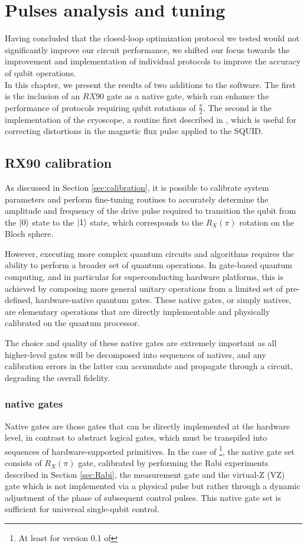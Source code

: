 \chapter{Pulses analysis and tuning}

Having concluded that the closed-loop optimization protocol we tested would not significantly improve our circuit performance, we shifted our focus towards the improvement and implementation of individual protocols to improve the accuracy of qubit operations.\\
In this chapter, we present the results of two additions to the \Qibocal software. 
The first is the inclusion of an $RX90$ gate as a native gate, which can enhance the performance of protocols requiring qubit rotations of $\frac{\pi}{2}$.
The second is the implementation of the cryoscope, a routine first described in \cite{rol_time-domain_2020}, which is useful for correcting distortions in the magnetic flux pulse applied to the SQUID.

\section{RX90 calibration}
As discussed in Section \ref{sec:calibration}, it is possible to calibrate system parameters and perform fine-tuning routines to accurately determine the amplitude and frequency of the drive pulse required to transition the qubit from the $\ket{0}$ state to the $\ket{1}$ state, which corresponds to the $R_X(\pi)$ rotation on the Bloch sphere.

However, executing more complex quantum circuits and algorithms requires the ability to perform a broader set of quantum operations. 
In gate-based quantum computing, and in particular for superconducting hardware platforms, this is achieved by composing more general unitary operations from a limited set of pre-defined, hardware-native quantum gates. 
These native gates, or simply natives, are elementary operations that are directly implementable and physically calibrated on the quantum processor.

The choice and quality of these native gates are extremely important as all higher-level gates will be decomposed into sequences of natives, and any calibration errors in the latter can accumulate and propagate through a circuit, degrading the overall fidelity. 

\subsection{\Qibolab native gates}\label{subsec:native_gates}
Native gates are those gates that can be directly implemented at the hardware level, in contrast to abstract logical gates, which must be transpiled into sequences of hardware-supported primitives. 
In the case of \Qibolab \footnote{At least for version 0.1 of \Qibolab}, the native gate set consists of $R_X(\pi)$ gate, calibrated by performing the Rabi experiments described in Section \ref{sec:Rabi}, the measurement gate and the virtual-Z (VZ) gate which is not implemented via a physical pulse but rather through a dynamic adjustment of the phase of subsequent control pulses. 
This native gate set is sufficient for universal single-qubit control.

